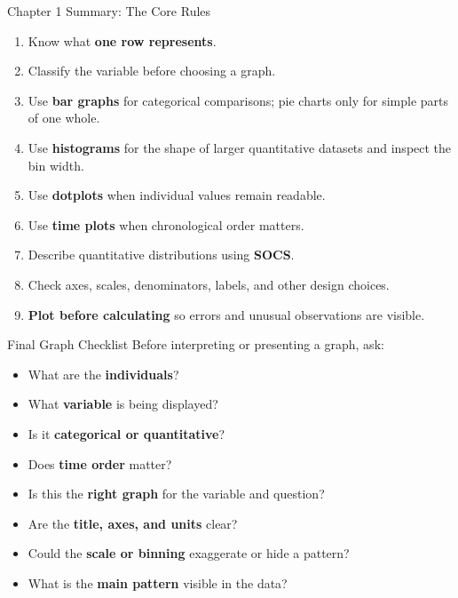 \documentclass[aspectratio=169]{beamer}
\begin{document}
\begin{frame}{Chapter 1 Summary: The Core Rules}
  \begin{enumerate}
    \item Know what \textbf{one row represents}.
    \item Classify the variable before choosing a graph.
    \item Use \textbf{bar graphs} for categorical comparisons; pie charts only for simple parts of one whole.
    \item Use \textbf{histograms} for the shape of larger quantitative datasets and inspect the bin width.
    \item Use \textbf{dotplots} when individual values remain readable.
    \item Use \textbf{time plots} when chronological order matters.
    \item Describe quantitative distributions using \textbf{SOCS}.
    \item Check axes, scales, denominators, labels, and other design choices.
    \item \textbf{Plot before calculating} so errors and unusual observations are visible.
  \end{enumerate}
\end{frame}

\begin{frame}{Final Graph Checklist}
  Before interpreting or presenting a graph, ask:
  \begin{itemize}
    \item What are the \textbf{individuals}?
    \item What \textbf{variable} is being displayed?
    \item Is it \textbf{categorical or quantitative}?
    \item Does \textbf{time order} matter?
    \item Is this the \textbf{right graph} for the variable and question?
    \item Are the \textbf{title, axes, and units} clear?
    \item Could the \textbf{scale or binning} exaggerate or hide a pattern?
    \item What is the \textbf{main pattern} visible in the data?
  \end{itemize}
\end{frame}



\end{document}
